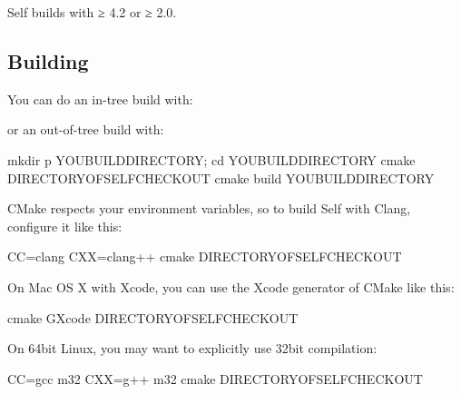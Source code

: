 \documentclass[letterpaper,10pt,english]{sphinxmanual}
\begin{document}
Self builds with  ≥ 4.2 or  ≥ 2.0.


\subsection{Building}
\label{\detokenize{buildvm:building}}
You can do an in-tree build with:

\begin{sphinxVerbatim}[commandchars=\\\{\}]
 
  
\end{sphinxVerbatim}

or an out-of-tree build with:

\begin{sphinxVerbatim}[commandchars=\\\{\}]
mkdir \PYGZhy{}p \PYGZdl{}YOU\PYGZus{}BUILD\PYGZus{}DIRECTORY; cd \PYGZdl{}YOU\PYGZus{}BUILD\PYGZus{}DIRECTORY
cmake \PYGZdl{}DIRECTORY\PYGZus{}OF\PYGZus{}SELF\PYGZus{}CHECKOUT
cmake \PYGZhy{}\PYGZhy{}build \PYGZdl{}YOU\PYGZus{}BUILD\PYGZus{}DIRECTORY
\end{sphinxVerbatim}

CMake respects your environment variables, so to build Self with Clang, configure it like this:

\begin{sphinxVerbatim}[commandchars=\\\{\}]
CC=clang CXX=clang++ cmake \PYGZdl{}DIRECTORY\PYGZus{}OF\PYGZus{}SELF\PYGZus{}CHECKOUT
\end{sphinxVerbatim}

On Mac OS X with Xcode, you can use the Xcode generator of CMake like this:

\begin{sphinxVerbatim}[commandchars=\\\{\}]
cmake \PYGZhy{}GXcode \PYGZdl{}DIRECTORY\PYGZus{}OF\PYGZus{}SELF\PYGZus{}CHECKOUT
\end{sphinxVerbatim}

On 64bit Linux, you may want to explicitly use 32bit compilation:

\begin{sphinxVerbatim}[commandchars=\\\{\}]
CC=\PYGZdq{}gcc \PYGZhy{}m32\PYGZdq{} CXX=\PYGZdq{}g++ \PYGZhy{}m32\PYGZdq{} cmake \PYGZdl{}DIRECTORY\PYGZus{}OF\PYGZus{}SELF\PYGZus{}CHECKOUT
\end{sphinxVerbatim}
\end{document}
